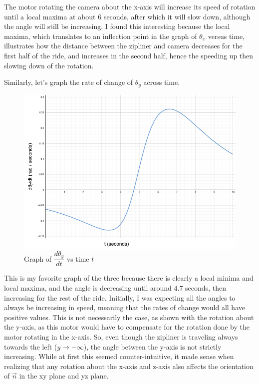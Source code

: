 \documentclass[12pt]{article}
\begin{document}
The motor rotating the camera about the x-axis will increase its speed of rotation until a local maxima at about 6 seconds, after which it will slow down, although the angle will still be increasing. I found this interesting because the local maxima, which translates to an inflection point in the graph of $\theta_x$ versus time, illustrates how the distance between the zipliner and camera decreases for the first half of the ride, and increases in the second half, hence the speeding up then slowing down of the rotation. 

\newpage 
Similarly, let's graph the rate of change of $\theta_y$ across time. 

\begin{figure}[H]
\centering
\includegraphics[width=500pt]{img/graph2.png}
\caption{\label{fig:4}Graph of $\dfrac{d\theta_y}{dt}$ vs time $t$}
\end{figure}

This is my favorite graph of the three because there is clearly a local minima and local maxima, and the angle is decreasing until around $4.7$ seconds, then increasing for the rest of the ride. Initially, I was expecting all the angles to always be increasing in speed, meaning that the rates of change would all have positive values. This is not necessarily the case, as shown with the rotation about the y-axis, as this motor would have to compensate for the rotation done by the motor rotating in the x-axis. So, even though the zipliner is traveling always towards the left ($y \to -\infty$), the angle between the y-axis is not strictly increasing. While at first this seemed counter-intuitive, it made sense when realizing that any rotation about the x-axis and z-axis also affects the orientation of $\vec n$ in the xy plane and yz plane. 
\end{document}

